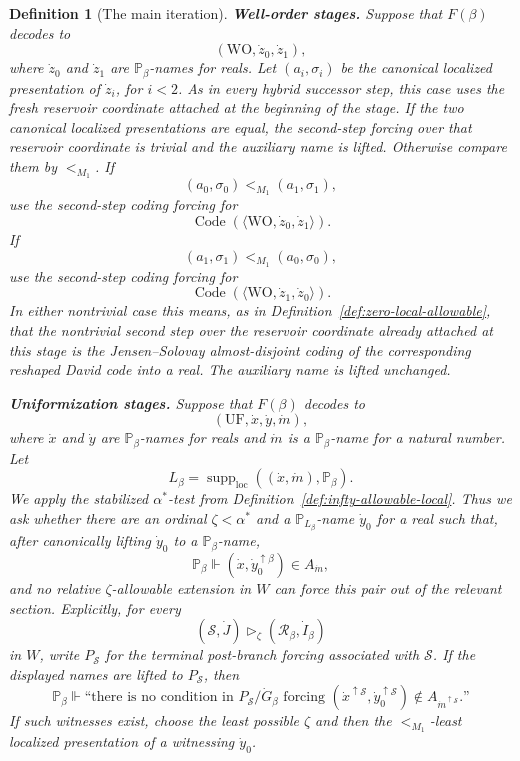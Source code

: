 \documentclass[a4paper,11pt]{article}
\newtheorem{definition}[theorem]{Definition}
\begin{document}
\begin{definition}[The main iteration]
\medskip
\noindent\textbf{Well-order stages.}
Suppose that $F(\beta)$ decodes to
\[
   (\mathrm{WO},\dot z_0,
   \dot z_1),
\]
where $\dot z_0$ and $\dot z_1$ are $\mathbb P_\beta$-names for reals.  Let $(a_i,\sigma_i)$ be the canonical localized presentation of $\dot z_i$, for $i<2$.  As in every hybrid successor step, this case uses the fresh reservoir coordinate attached at the beginning of the stage.  If the two canonical localized presentations are equal, the second-step forcing over that reservoir coordinate is trivial and the auxiliary name is lifted.  Otherwise compare them by $<_{M_1}$.  If
\[
   (a_0,\sigma_0)<_{M_1}(a_1,\sigma_1),
\]
use the second-step coding forcing for
\[
   \operatorname{Code}(\langle\mathrm{WO},\dot z_0,
      \dot z_1\rangle).
\]
If
\[
   (a_1,\sigma_1)<_{M_1}(a_0,\sigma_0),
\]
use the second-step coding forcing for
\[
   \operatorname{Code}(\langle\mathrm{WO},\dot z_1,
      \dot z_0\rangle).
\]
In either nontrivial case this means, as in Definition~\ref{def:zero-local-allowable}, that the nontrivial second step over the reservoir coordinate already attached at this stage is the Jensen--Solovay almost-disjoint coding of the corresponding reshaped David code into a real.  The auxiliary name is lifted unchanged.

\medskip
\noindent\textbf{Uniformization stages.}
Suppose that $F(\beta)$ decodes to
\[
   (\mathrm{UF},\dot x,
   \dot y,
   \dot m),
\]
where $\dot x$ and $\dot y$ are $\mathbb P_\beta$-names for reals and $\dot m$ is a $\mathbb P_\beta$-name for a natural number.  Let
\[
   L_\beta=
   \operatorname{supp}_{\mathrm{loc}}((\dot x,
      \dot m),\mathbb P_\beta).
\]
We apply the stabilized $\alpha^\ast$-test from Definition~\ref{def:infty-allowable-local}.  Thus we ask whether there are an ordinal $\zeta<\alpha^\ast$ and a $\mathbb P_{L_\beta}$-name $\dot y_0$ for a real such that, after canonically lifting $\dot y_0$ to a $\mathbb P_\beta$-name,
\[
   \mathbb P_\beta\Vdash
   (\dot x,\dot y_0^{\uparrow\beta})\in A_{\dot m},
\]
and no relative $\zeta$-allowable extension in $W$ can force this pair out of the relevant section.  Explicitly, for every
\[
   (\mathcal S,
   \dot J)\triangleright_\zeta
   (\mathcal R_\beta,
   \dot I_\beta)
\]
in $W$, write $P_{\mathcal S}$ for the terminal post-branch forcing associated
with $\mathcal S$.  If the displayed names are lifted to $P_{\mathcal S}$, then
\[
   \mathbb P_\beta\Vdash
   \text{``there is no condition in }
   P_{\mathcal S}/\dot G_\beta
   \text{ forcing }
   (\dot x^{\uparrow\mathcal S},
    \dot y_0^{\uparrow\mathcal S})
      \notin A_{\dot m^{\uparrow\mathcal S}}\text{.''}
\]
If such witnesses exist, choose the least possible $\zeta$ and then the $<_{M_1}$-least localized presentation of a witnessing $\dot y_0$.


\end{definition}
\end{document}

